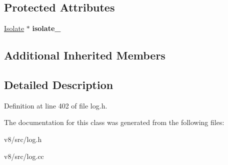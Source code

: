 \subsection*{Protected Attributes}
\begin{DoxyCompactItemize}
\item 
\mbox{\label{classv8_1_1internal_1_1CodeEventLogger_a2934bdcd8baa3f759b111ea3235ef170}} 
\mbox{\hyperlink{classv8_1_1internal_1_1Isolate}{Isolate}} $\ast$ {\bfseries isolate\+\_\+}
\end{DoxyCompactItemize}
\subsection*{Additional Inherited Members}


\subsection{Detailed Description}


Definition at line 402 of file log.\+h.



The documentation for this class was generated from the following files\+:\begin{DoxyCompactItemize}
\item 
v8/src/log.\+h\item 
v8/src/log.\+cc\end{DoxyCompactItemize}
